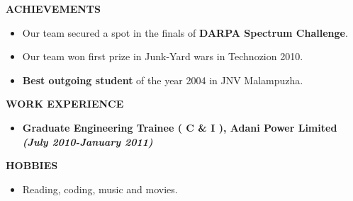 \documentclass[a4paper,10pt]{article}
\begin{document}
 \colorbox{titleColor}{\parbox{6.5in}{\textbf{ACHIEVEMENTS}}}

 \begin{itemize}
 \item Our team secured a spot in the finals of \textbf{DARPA Spectrum Challenge}.
 \item Our team won first prize in Junk-Yard wars in Technozion 2010.
 \item \textbf{Best outgoing student} of the year 2004 in JNV Malampuzha.
  \end{itemize}

  \colorbox{titleColor}{\parbox{6.5in}{\textbf{WORK EXPERIENCE}}}

    \begin{itemize}
      \setlength{\itemsep}{1pt}
      \item \textbf{Graduate Engineering Trainee ( C \& I ), Adani Power Limited}  \textbf \emph{(July 2010-January 2011)}
    \end{itemize}
    
\colorbox{titleColor}{\parbox{6.5in}{\textbf{HOBBIES}}}

\begin{itemize}
 \setlength{\itemsep}{1pt}
    \item Reading, coding, music and movies.
  \end{itemize}
\end{document}
